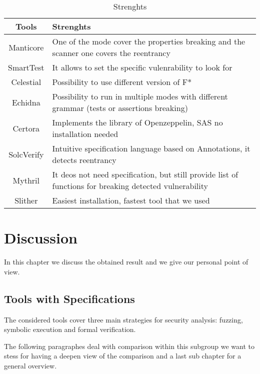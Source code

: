 \begin{table*}
    \caption{Strenghts}
        \label{tab:Strenghts}
        \begin{tabular}{cl}
        \toprule
            Tools  &  Strenghts \\
            \midrule
            Manticore & One of the mode cover the properties breaking and the scanner one covers the reentrancy\\
            SmartTest & It allows to set the specific vulenrability to look for  \\
            Celestial & Possibility to use different version of F*  \\
            Echidna &  Possibility to run in multiple modes with different grammar (tests or assertions breaking)\\
            Certora & Implements the library of Openzeppelin, SAS no installation needed \\ 
            SolcVerify & Intuitive specification language based on Annotations, it detects reentrancy\\
            Mythril & It deos not need specification, but still provide list of functions for breaking detected vulnerability  \\ 
            Slither & Easiest installation, fastest tool that we used \\ 
        \bottomrule
        \end{tabular}
    \end{table*}

\chapter{Discussion}
\label{ch:Discussionn}
In this chapter we discuss the obtained result and we give our personal point of view. 

\section{Tools with Specifications}
The considered tools cover three main strategies for security analysis: fuzzing, symbolic execution and formal verification. 

The following paragraphes deal with comparison within this subgroup we want to stess for having a deepen view of the comparison and a last sub chapter for a general overview.

